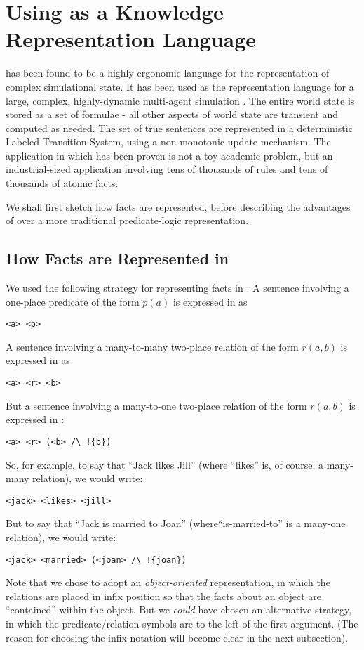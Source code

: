 \section{Using \ELFULL{} as a Knowledge Representation Language}\label{kr}

\ELFULL{} has been found to be a highly-ergonomic language for the
representation of complex simulational state.  It has been used as the
representation language for a large, complex, highly-dynamic
multi-agent simulation \cite{evans-and-short}.  The entire world state
is stored as a set of formulae - all other aspects of world state are
transient and computed as needed.  The set of true sentences are represented in a deterministic Labeled Transition System, using a non-monotonic update mechanism.  The application in which \ELABR{} has been
proven is not a toy academic problem, but an industrial-sized
application involving tens of thousands of rules and tens of thousands
of atomic facts.

We shall first sketch how facts are represented, before describing the advantages of \ELABR{} over a more traditional predicate-logic representation.

\subsection{How Facts are Represented in \ELABR{}}

We used the following strategy for representing facts in \ELABR{}.
A sentence involving a one-place predicate of the form $p(a)$ is expressed in \ELABR{} as 
\begin{verbatim}
<a> <p>
\end{verbatim}
A sentence involving a many-to-many two-place relation of the form $r(a,b)$ is expressed in \ELABR{} as
\begin{verbatim}
<a> <r> <b>
\end{verbatim}
But a sentence involving a many-to-one two-place relation of the form $r(a,b)$ is expressed in \ELABR{}:
\begin{verbatim}
<a> <r> (<b> /\ !{b})
\end{verbatim}
So, for example, to say that ``Jack likes Jill'' (where ``likes'' is, of course, a many-many relation), we would write:
\begin{verbatim}
<jack> <likes> <jill>
\end{verbatim}
But to say that ``Jack is married to Joan'' (where``is-married-to'' is a many-one relation), we would write:
\begin{verbatim}
<jack> <married> (<joan> /\ !{joan})
\end{verbatim}
Note that we chose to adopt an \emph{object-oriented} representation, in which the relations are placed in infix position so that the facts about an object are ``contained'' within the object.
But we \emph{could} have chosen an alternative strategy, in which the predicate/relation symbols are to the left of the first argument. (The reason for choosing the infix notation will become clear in the next subsection).

